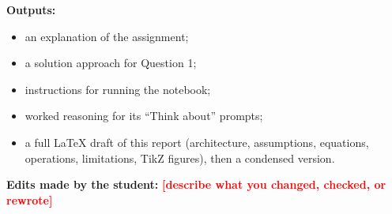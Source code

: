 \documentclass[11pt,a4paper]{article}
\newcommand{\todo}[1]{\textcolor{red}{\textbf{[#1]}}}
\begin{document}
{\noindent\textbf{Outputs:}
\begin{itemize}
  \item an explanation of the assignment;
  \item a solution approach for Question 1;
  \item instructions for running the notebook;
  \item worked reasoning for its ``Think about'' prompts;
  \item a full LaTeX draft of this report (architecture, assumptions, equations,
        operations, limitations, TikZ figures), then a condensed version.
\end{itemize}

\noindent\textbf{Edits made by the student:}
\todo{describe what you changed, checked, or rewrote}
}
\end{document}
